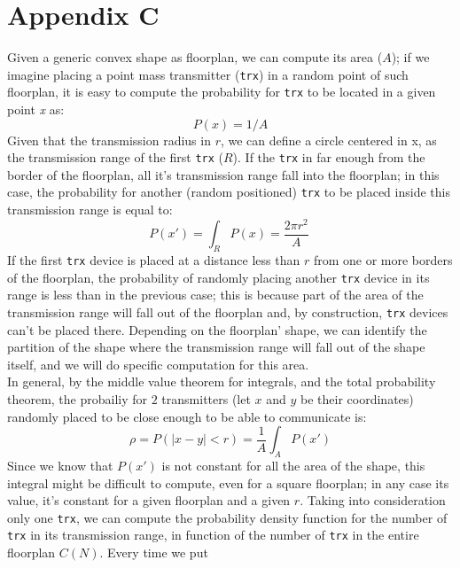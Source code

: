 \section{Appendix C}
\label{app:c}
Given a generic convex shape as floorplan, we can compute its area ($A$); if we
imagine placing a point mass transmitter (\texttt{trx}) in a random point of
such floorplan, it is easy to compute the probability for \texttt{trx} to be
located in a given point \textit{x} as:
\begin{equation*}
    P(x) = 1/A
\end{equation*}
Given that the transmission radius in $r$, we can define a circle centered in x, 
as the transmission range of the first \texttt{trx} ($R$). If the \texttt{trx}
in far enough from the border of the floorplan, all it's transmission range fall
into the floorplan; in this case, the probability for another (random
positioned) \texttt{trx} to be placed inside this transmission range is equal to:
\begin{equation*}
    P(x') = \int_{R}^{} P(x)= \frac{2\pi r^2}{A} \ 
\end{equation*}
If the first \texttt{trx} device is placed at a distance less than $r$ from one
or more borders of the floorplan, the probability of randomly placing another
\texttt{trx} device in its range is less than in the previous case; this is
because part of the area of the transmission range will fall out of the
floorplan and, by construction, \texttt{trx} devices can't be placed there. 
Depending on the floorplan' shape, we can identify the partition of the shape
where the transmission range will fall out of the shape itself, and we will do
specific computation for this area.\\
In general, by the middle value theorem for integrals, and the total probability
theorem, the probailiy for $2$ transmitters (let $x$ and $y$ be their
coordinates) randomly placed to be close enough to be able to communicate is:
\begin{equation*}
    \rho = P(|x-y|<r) = \frac{1}{A} \int_{A}^{} P(x')
\end{equation*}
Since we know that $P(x')$ is not constant for all the area of the shape, this
integral might be difficult to compute, even for a square floorplan; in any case
its value, it's constant for a given floorplan and a given $r$. Taking into
consideration only one \texttt{trx}, we can compute the probability density
function for the number of \texttt{trx} in its transmission range, in function
of the number of \texttt{trx} in the entire floorplan $C(N)$. Every time we put

